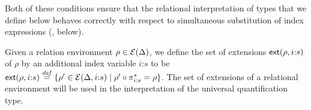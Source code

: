 Both of these conditions ensure that the relational interpretation of
types that we define below behaves correctly with respect to
simultaneous substitution of index expressions
(, below).




Given a relation environment $\rho \in \mathcal{E}(\Delta)$, we define
the set of extensions $\mathsf{ext}(\rho,i\mathord:s)$ of $\rho$ by an
additional index variable $i\mathord:s$ to be
$\mathsf{ext}(\rho,i\mathord:s) \stackrel{\mathit{def}}= \{ \rho' \in
\mathcal{E}(\Delta,i\mathord:s) \mathrel| \rho' \circ \pi^*_{i\mathord:s}
= \rho \}$. The set of extensions of a relational environment will be
used in the interpretation of the universal quantification type.

